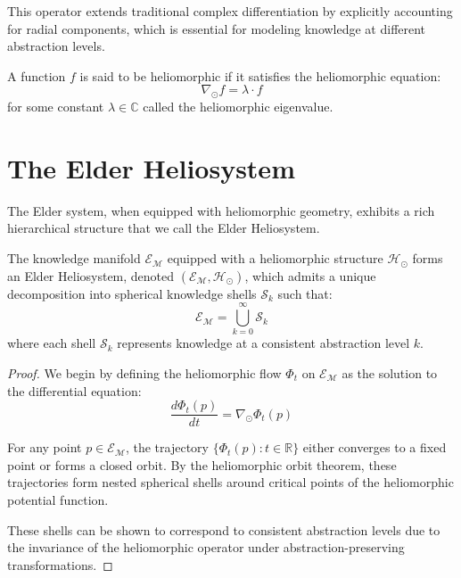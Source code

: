 This operator extends traditional complex differentiation by explicitly accounting for radial components, which is essential for modeling knowledge at different abstraction levels.

A function $f$ is said to be heliomorphic if it satisfies the heliomorphic equation:
\begin{equation}
\nabla_{\odot} f = \lambda \cdot f
\end{equation}
for some constant $\lambda \in \mathbb{C}$ called the heliomorphic eigenvalue.

\section{The Elder Heliosystem}

The Elder system, when equipped with heliomorphic geometry, exhibits a rich hierarchical structure that we call the Elder Heliosystem.

\begin{theorem}
The knowledge manifold $\mathcal{E}_{\mathcal{M}}$ equipped with a heliomorphic structure $\mathcal{H}_{\odot}$ forms an Elder Heliosystem, denoted $(\mathcal{E}_{\mathcal{M}}, \mathcal{H}_{\odot})$, which admits a unique decomposition into spherical knowledge shells $\mathcal{S}_k$ such that:
\begin{equation}
\mathcal{E}_{\mathcal{M}} = \bigcup_{k=0}^{\infty} \mathcal{S}_k
\end{equation}
where each shell $\mathcal{S}_k$ represents knowledge at a consistent abstraction level $k$.
\end{theorem}

\begin{proof}
We begin by defining the heliomorphic flow $\Phi_t$ on $\mathcal{E}_{\mathcal{M}}$ as the solution to the differential equation:
\begin{equation}
\frac{d\Phi_t(p)}{dt} = \nabla_{\odot} \Phi_t(p)
\end{equation}

For any point $p \in \mathcal{E}_{\mathcal{M}}$, the trajectory $\{\Phi_t(p) : t \in \mathbb{R}\}$ either converges to a fixed point or forms a closed orbit. By the heliomorphic orbit theorem, these trajectories form nested spherical shells around critical points of the heliomorphic potential function.

These shells can be shown to correspond to consistent abstraction levels due to the invariance of the heliomorphic operator under abstraction-preserving transformations.
\end{proof}

